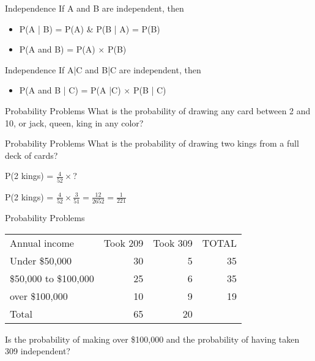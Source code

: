 \documentclass[presentation]{beamer}
\begin{document}
\begin{frame}[label={sec:org4866571}]{Independence}
If A and B are independent, then

\begin{itemize}
\item P(A | B) = P(A) \&  P(B | A) = P(B)

\item P(A and B) = P(A) \(\times\) P(B)
\end{itemize}
\end{frame}

\begin{frame}[label={sec:orgdc46190}]{Independence}
If A|C and B|C are independent, then

\begin{itemize}
\item P(A and B | C) = P(A |C) \(\times\) P(B | C)
\end{itemize}
\end{frame}



\begin{frame}[label={sec:orga2cca68}]{Probability Problems}
What is the probability of drawing any card between 2 and
10, or jack, queen, king in any color?
\end{frame}


\begin{frame}[label={sec:org3c97384}]{Probability Problems}
What is the probability of drawing two kings from a full deck of cards?

\pause

P(2 kings) = \(\frac{4}{52} \times\)?

\pause

P(2 kings) = \(\frac{4}{52} \times \frac{3}{51} = \frac{12}{2652} =\frac{1}{221}\)
\end{frame}


\begin{frame}[label={sec:orgd725de6}]{Probability Problems}
\begin{center}
\begin{tabular}{lrrr}
Annual income & Took 209 & Took 309 & TOTAL\\
Under \$50,000 & 30 & 5 & 35\\
\$50,000 to \$100,000 & 25 & 6 & 35\\
over \$100,000 & 10 & 9 & 19\\
Total & 65 & 20 & \\
\end{tabular}
\end{center}

Is the probability of making over \$100,000 and the probability of having taken 309 independent?
\end{frame}
\end{document}
